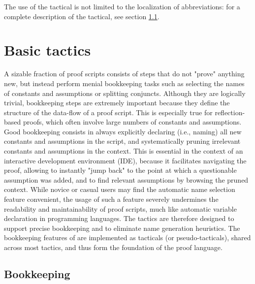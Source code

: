 The use of the  tactical is not limited to the localization of
abbreviations: for a complete description of the  tactical, see
section \ref{ssec:profstack}.
\section{Basic tactics}\label{sec:book}



A sizable fraction of proof scripts consists of steps that do not
"prove" anything new, but instead perform menial bookkeeping tasks
such as selecting the names of constants and assumptions or splitting
conjuncts. Although they are logically trivial, bookkeeping steps are
extremely important because they define the structure of the data-flow
of a proof script. This is especially true for reflection-based
proofs, which often involve large numbers of constants and
assumptions.  Good bookkeeping consists in always explicitly declaring
(i.e., naming) all new constants and assumptions in the script, and
systematically pruning irrelevant constants and assumptions in the
context. This is essential in the context of an interactive
development environment (IDE), because it facilitates navigating the
proof, allowing to instantly "jump back" to the point at which a
questionable assumption was added, and to find relevant assumptions by
browsing the pruned context.  While novice or casual \Coq{} users may
find the automatic name selection feature convenient, the usage of
such a feature severely undermines the readability and maintainability
of proof scripts, much like automatic variable declaration in programming
languages. The \ssr{} tactics are therefore designed to support
precise bookkeeping and to eliminate name generation heuristics.
The bookkeeping features of \ssr{} are implemented as tacticals (or
pseudo-tacticals), shared across most \ssr{} tactics, and thus form
the foundation of the \ssr{} proof language.

\subsection{Bookkeeping}\label{ssec:profstack}


